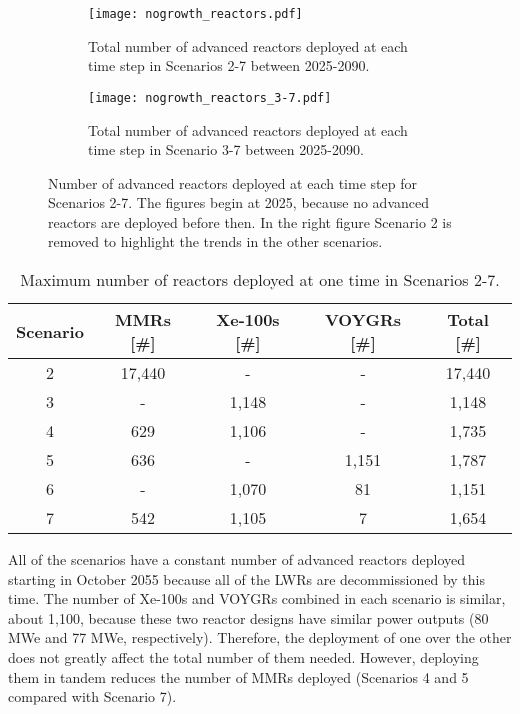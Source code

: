 \begin{figure}[h!]
    \centering
    \begin{subfigure}[b]{0.45\textwidth}
        \centering
        \texttt{[image: nogrowth\_reactors.pdf]}
        \caption{Total number of advanced reactors deployed at 
        each time step in Scenarios 2-7 between 2025-2090.}
        \label{fig:nogrowth_reactors_all}
    \end{subfigure}
    \hfill
    \begin{subfigure}[b]{0.45\textwidth}
        \centering
        \texttt{[image: nogrowth\_reactors\_3-7.pdf]}
        \caption{Total number of advanced reactors deployed at 
        each time step in Scenario 3-7 between 2025-2090.}
        \label{fig:nogrowth_reactors_3-7}
    \end{subfigure}
       \caption{Number of advanced reactors deployed at each time step 
       for Scenarios 2-7. The figures begin at 2025, because no advanced 
       reactors are deployed before then. In the right figure Scenario 
       2 is removed to highlight the trends in the other scenarios.}
       \label{fig:nogrowth_reactors}
\end{figure}

\begin{table}[h!]
    \centering 
    \caption{Maximum number of reactors deployed at one time in 
    Scenarios 2-7.}
    \label{tab:reactors_nogrowth}
    \begin{tabular}{c c c c c}
        \hline
        Scenario & \glspl{MMR} [\#] & Xe-100s [\#] & VOYGRs [\#] 
        & Total [\#]\\\hline
        2 & 17,440 & - & - & 17,440\\
        3 & - & 1,148 & - & 1,148\\
        4 & 629 & 1,106 & - & 1,735\\
        5 & 636 & - & 1,151 & 1,787\\
        6 & - & 1,070 & 81 & 1,151\\
        7 & 542 & 1,105 & 7 & 1,654\\
        \hline
    \end{tabular}
\end{table}

All of the scenarios have a constant number of advanced reactors 
deployed starting in October 2055 because all of the \glspl{LWR} are 
decommissioned by this time. The number of Xe-100s and VOYGRs combined 
in each scenario is similar, about 1,100, because these two reactor 
designs have similar power outputs (80 MWe and 77 MWe, respectively). 
Therefore, the deployment of one over the other does 
not greatly affect the total number of them needed. However, 
deploying them in tandem reduces the number of \glspl{MMR} deployed
(Scenarios 4 and 5 compared with Scenario 7). 

